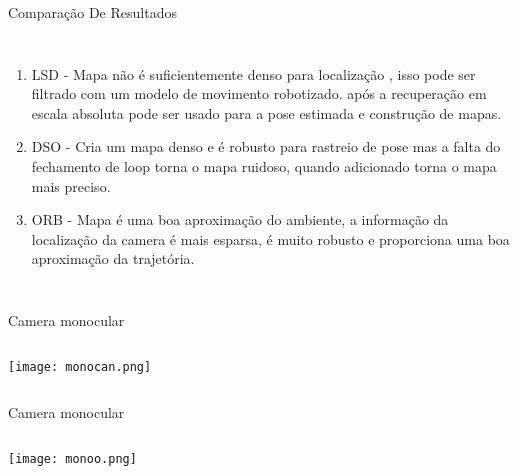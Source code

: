 \begin{frame}[t]{Comparação De Resultados}
    \transboxout[duration=0.5]
    \begin{columns}
            \begin{enumerate}
                \item LSD - Mapa não é suficientemente denso para localização , isso pode ser filtrado com um modelo de movimento robotizado. após a recuperação em escala absoluta pode ser usado para a pose estimada e construção de mapas.
                \item DSO - Cria um mapa denso e é robusto para rastreio de pose mas a falta do fechamento de loop torna o mapa ruidoso, quando adicionado torna o mapa mais preciso.
                \item ORB - Mapa é uma boa aproximação do ambiente, a informação da localização da camera é mais esparsa, é muito robusto  e proporciona uma boa aproximação da trajetória. 
            \end{enumerate}
    \end{columns}
\end{frame}
\begin{frame}[t]{Camera monocular}
    \transboxout[duration=0.5]
    \begin{columns}
            \texttt{[image: monocan.png]}
    \end{columns}
\end{frame}
\begin{frame}[t]{Camera monocular}
    \transboxout[duration=0.5]
    \begin{columns}
            \texttt{[image: monoo.png]}
    \end{columns}
\end{frame}
